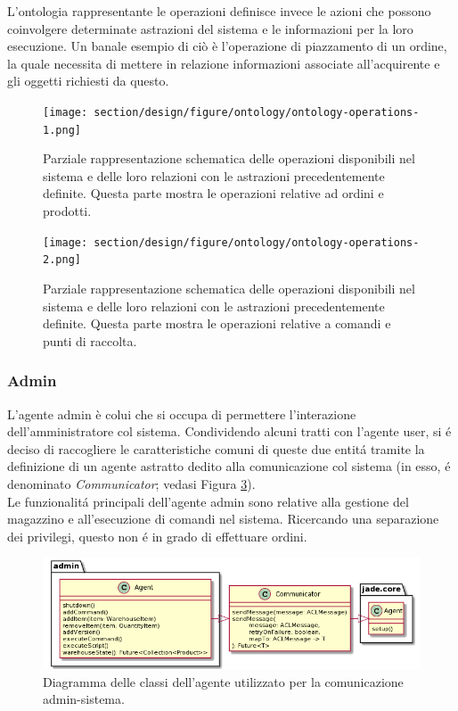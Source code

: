 %
\parag
L'ontologia rappresentante le operazioni definisce invece le azioni che possono coinvolgere determinate astrazioni del sistema e le informazioni per la loro esecuzione. Un banale esempio di ciò è l'operazione di piazzamento di un ordine, la quale necessita di mettere in relazione informazioni associate all'acquirente e gli oggetti richiesti da questo.
\begin{figure}[!ht]\centering
    \texttt{[image: section/design/figure/ontology/ontology-operations-1.png]}%
    \caption{Parziale rappresentazione schematica delle operazioni disponibili nel sistema e delle loro relazioni con le astrazioni precedentemente definite. Questa parte mostra le operazioni relative ad ordini e prodotti.}
    \label{fig:ontology_operations-1}
\end{figure}
\begin{figure}[!ht]\centering
    \texttt{[image: section/design/figure/ontology/ontology-operations-2.png]}%
    \caption{Parziale rappresentazione schematica delle operazioni disponibili nel sistema e delle loro relazioni con le astrazioni precedentemente definite. Questa parte mostra le operazioni relative a comandi e punti di raccolta.}
    \label{fig:ontology_operations-2}
\end{figure}%

\subsubsection{Admin}
L'agente admin \`e colui che si occupa di permettere l'interazione dell'amministratore col sistema. Condividendo alcuni tratti con l'agente user, si \'e deciso di raccogliere le caratteristiche comuni di queste due entit\'a tramite la definizione di un agente astratto dedito alla comunicazione col sistema (in esso, \'e denominato \textit{Communicator}; vedasi Figura \ref{fig:class_diagram_admin_agent}).\\
Le funzionalit\'a principali dell'agente admin sono relative alla gestione del magazzino e all'esecuzione di comandi nel sistema. Ricercando una separazione dei privilegi, questo non \'e in grado di effettuare ordini.
\begin{figure}[!ht]\centering
    \includegraphics[width=\textwidth]{section/design/figure/admin/class_diagram.png}
    \caption{Diagramma delle classi dell'agente utilizzato per la comunicazione admin-sistema.}
    \label{fig:class_diagram_admin_agent}
\end{figure}

